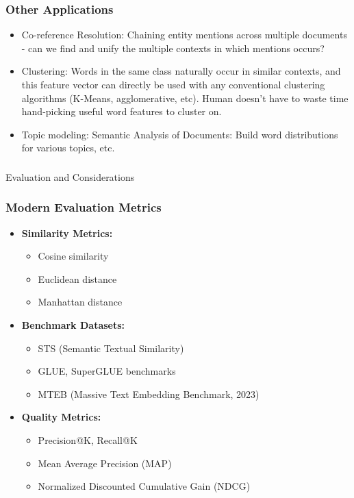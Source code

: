\begin{frame}[fragile]\frametitle{Other Applications}
\begin{itemize}
\item Co-reference Resolution: Chaining entity mentions across multiple documents  - can we find and unify the multiple contexts in which mentions occurs?
\item Clustering: Words in the same class naturally occur in similar contexts,  and this feature vector can directly be used with any conventional clustering algorithms (K-Means, agglomerative, etc). Human doesn't have to waste time hand-picking useful word features to cluster on.
\item Topic modeling: Semantic Analysis of Documents: Build word distributions for various topics, etc.

\end{itemize}
\end{frame}

\begin{frame}[fragile]\frametitle{}

\begin{center}
{\Large Evaluation and Considerations}
\end{center}
\end{frame}

\begin{frame}[fragile]\frametitle{Modern Evaluation Metrics}
\begin{itemize}
\item \textbf{Similarity Metrics:}
  \begin{itemize}
  \item Cosine similarity
  \item Euclidean distance
  \item Manhattan distance
  \end{itemize}
\item \textbf{Benchmark Datasets:}
  \begin{itemize}
  \item STS (Semantic Textual Similarity)
  \item GLUE, SuperGLUE benchmarks
  \item MTEB (Massive Text Embedding Benchmark, 2023)
  \end{itemize}
\item \textbf{Quality Metrics:}
  \begin{itemize}
  \item Precision@K, Recall@K
  \item Mean Average Precision (MAP)
  \item Normalized Discounted Cumulative Gain (NDCG)
  \end{itemize}
\end{itemize}
\end{frame}

